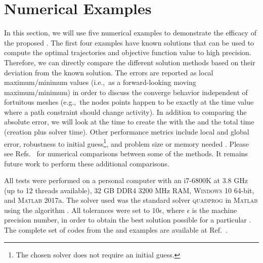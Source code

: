 \section{Numerical Examples} \label{sec:ch5:examples}

In this section, we will use five numerical examples to demonstrate the efficacy of the proposed \apgp.
The first four examples have known solutions that can be used to compute the optimal trajectories and objective function value to high precision.
Therefore, we can directly compare the different solution methods based on their deviation from the known solution.
The errors are reported as local maximum/minimum values (i.e.,~as a forward-looking moving maximum/minimum) in order to discuss the converge behavior independent of fortuitous meshes (e.g.,~the nodes points happen to be exactly at the time value where a path constraint should change activity).
In addition to comparing the absolute error, we will look at the time to create the \qp{} with the \apgp{} and the total \qp{} time (creation plus solver time).
Other performance metrics include local and global error, robustness to initial guess\footnote{The chosen solver does not require an initial guess.}, and problem size or memory needed \cite{Williams2005a, Wang2009a}.
Please see Refs.~\cite{Williams2005a, Wang2009a, Faedo2017a} for numerical comparisons between some of the \dt{} methods.
It remains future work to perform these additional comparisons.

All tests were performed on a personal computer with an i7-6800K at 3.8 GHz (up to 12 threads available), 32 GB DDR4 3200 MHz RAM, \textsc{Windows} 10 64-bit, and \textsc{Matlab} 2017a.
The \qp{} solver used was the standard solver \textsc{quadprog} in \textsc{Matlab} using the  algorithm \cite{matlab-quadprog}.
All tolerances were set to $10\epsilon$, where $\epsilon$ is the machine precision number, in order to obtain the best solution possible for a particular \qp.
The complete set of codes from the \apgp{} and examples are available at Ref.~\cite{github-dt-qp-project}.









